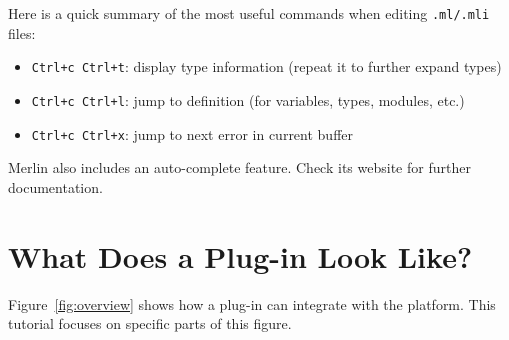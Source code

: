 Here is a quick summary of the most useful commands when editing
\texttt{.ml/.mli} files:

\begin{itemize}
\item \texttt{Ctrl+c  Ctrl+t}: display type information
  (repeat it to further expand types)
\item \texttt{Ctrl+c  Ctrl+l}: jump to definition
  (for variables, types, modules, etc.)
\item \texttt{Ctrl+c  Ctrl+x}: jump to next error in current buffer
\end{itemize}

Merlin also includes an auto-complete feature. Check its website for
further documentation.

\section{What Does a Plug-in Look Like?}\label{tut2:architecture}

Figure~\ref{fig:overview} shows how a plug-in can integrate with the \framac
platform. This tutorial focuses on specific parts of this figure.

